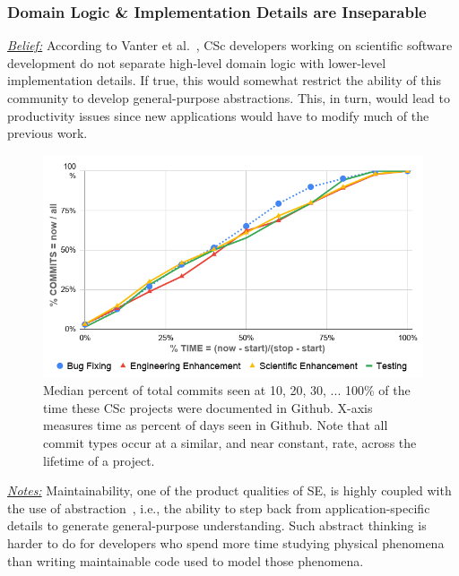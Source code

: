 \documentclass[conference,10pt]{IEEEtran}
\begin{document}
\subsubsection{Domain Logic \& Implementation Details are Inseparable}\label{tion:separation}




\noindent \textit{\underline{Belief:}} 
According to Vanter et al.~\cite{faulk09_secs},
CSc developers working on scientific software development do not separate high-level domain logic with
lower-level implementation details. If true, this would somewhat restrict the ability
of this community to develop general-purpose abstractions. This, in turn, would lead
to productivity issues since new applications would have to modify much of the previous
work. 



\begin{figure}[!t]
\vspace{-15pt}
\begin{center}\includegraphics[width=\linewidth]{img/commits_belief1.png}\end{center} 
\vspace{-10pt}
\caption{Median percent  of total commits seen
at 10, 20, 30, ... 100\% of 
the time these CSc projects were
documented in Github.
X-axis measures time as percent of days seen in Github.
Note
that all commit types occur
at a similar, and near constant,
 rate, across the lifetime of a project.}\label{fig:belief1} 
\vspace{-5mm} 
\end{figure} 



\noindent \textit{\underline{Notes:}} Maintainability, one of the product qualities of SE, is highly coupled with the
use of abstraction~\cite{huang_abstraction}, i.e., the ability to step back from application-specific
details to generate general-purpose understanding. Such abstract thinking is harder to do for developers who spend more time studying physical phenomena than writing maintainable code used to model those phenomena.
\end{document}
